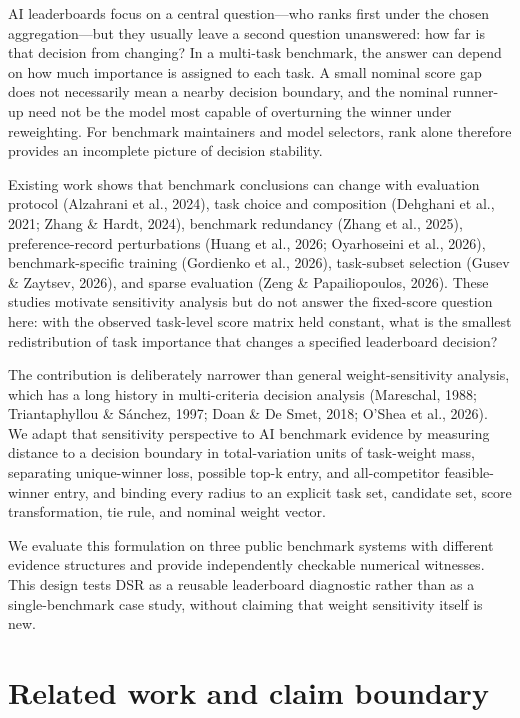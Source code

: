 \documentclass[11pt]{article}
\begin{document}
AI leaderboards focus on a central question—who ranks first under the chosen aggregation—but they usually leave a second question unanswered: how far is that decision from changing? In a multi-task benchmark, the answer can depend on how much importance is assigned to each task. A small nominal score gap does not necessarily mean a nearby decision boundary, and the nominal runner-up need not be the model most capable of overturning the winner under reweighting. For benchmark maintainers and model selectors, rank alone therefore provides an incomplete picture of decision stability.

Existing work shows that benchmark conclusions can change with evaluation protocol (Alzahrani et al., 2024), task choice and composition (Dehghani et al., 2021; Zhang \& Hardt, 2024), benchmark redundancy (Zhang et al., 2025), preference-record perturbations (Huang et al., 2026; Oyarhoseini et al., 2026), benchmark-specific training (Gordienko et al., 2026), task-subset selection (Gusev \& Zaytsev, 2026), and sparse evaluation (Zeng \& Papailiopoulos, 2026). These studies motivate sensitivity analysis but do not answer the fixed-score question here: with the observed task-level score matrix held constant, what is the smallest redistribution of task importance that changes a specified leaderboard decision?

The contribution is deliberately narrower than general weight-sensitivity analysis, which has a long history in multi-criteria decision analysis (Mareschal, 1988; Triantaphyllou \& Sánchez, 1997; Doan \& De Smet, 2018; O’Shea et al., 2026). We adapt that sensitivity perspective to AI benchmark evidence by measuring distance to a decision boundary in total-variation units of task-weight mass, separating unique-winner loss, possible top-k entry, and all-competitor feasible-winner entry, and binding every radius to an explicit task set, candidate set, score transformation, tie rule, and nominal weight vector.

We evaluate this formulation on three public benchmark systems with different evidence structures and provide independently checkable numerical witnesses. This design tests DSR as a reusable leaderboard diagnostic rather than as a single-benchmark case study, without claiming that weight sensitivity itself is new.

\section{Related work and claim boundary}
\end{document}

